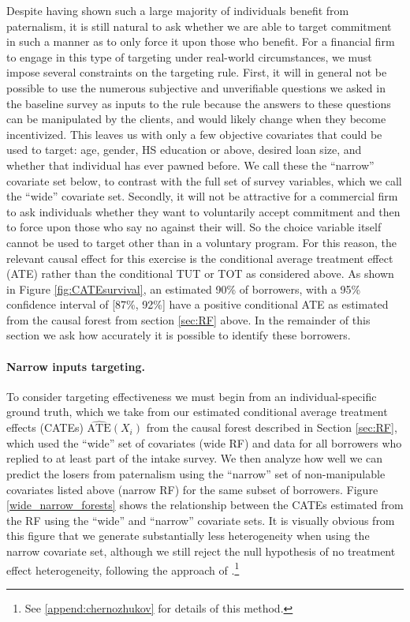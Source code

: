 \documentclass[oneside,11pt]{article}
\begin{document}
Despite having shown such a large majority of individuals benefit from paternalism, it is still natural to ask whether we are able to target commitment in such a manner as to only force it upon those who benefit. For a financial firm to engage in this type of targeting under real-world circumstances, we must impose several constraints on the targeting rule.  First, it will in general not be possible to use the numerous subjective and unverifiable questions we asked in the baseline survey as inputs to the rule because the answers to these questions can be manipulated by the clients, and would likely change when they become incentivized. This leaves us with only a few objective covariates that could be used to target: age, gender, HS education or above, desired loan size, and whether that individual has ever pawned before. 
We call these the ``narrow'' covariate set below, to contrast with the full set of survey variables, which we call the ``wide'' covariate set.
Secondly, it will not be attractive for a commercial firm to ask individuals whether they want to voluntarily accept commitment and then to force upon those who say no against their will. So the choice variable itself cannot be used to target other than in a voluntary program. 
For this reason, the relevant causal effect for this exercise is the conditional average treatment effect (ATE) rather than the conditional TUT or TOT as considered above.
As shown in Figure \ref{fig:CATEsurvival}, an estimated 90\% of borrowers, with a 95\% confidence interval of [87\%, 92\%] have a positive conditional ATE as estimated from the causal forest from section \ref{sec:RF} above.
In the remainder of this section we ask how accurately it is possible to identify these borrowers. 

\paragraph{Narrow inputs targeting.} To  consider targeting effectiveness we must begin from an individual-specific ground truth, which we take from our estimated conditional average treatment effects (CATEs) $\widehat{\text{ATE}}(X_i)$ from the causal forest described in Section \ref{sec:RF},  which used the ``wide'' set of covariates (wide RF) and data for all borrowers who replied to at least part of the intake survey. We then analyze how well we can predict the losers from paternalism using the ``narrow'' set of non-manipulable covariates listed above (narrow RF) for the same subset of borrowers.
Figure \ref{wide_narrow_forests} shows the relationship between the CATEs estimated from the RF using the ``wide'' and ``narrow'' covariate sets.  It is visually obvious from this figure that we generate substantially less heterogeneity when using the narrow covariate set, although we still reject the null hypothesis of no treatment effect heterogeneity, following the approach of \cite{chernozhukov2018generic}.\footnote{See \ref{append:chernozhukov} for details of this method.}
\end{document}
